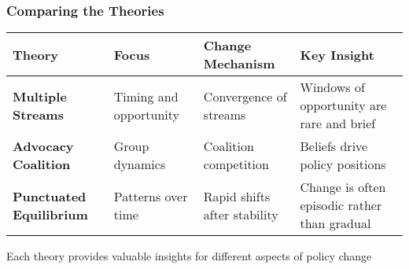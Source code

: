 \documentclass[10pt]{beamer}
\begin{document}
\begin{frame}
\frametitle{Comparing the Theories}

\begin{table}
\centering
\small
\begin{tabular}{|p{2.3cm}|p{2.3cm}|p{2.5cm}|p{3cm}|}
\hline
\centering\textbf{Theory} & \centering\textbf{Focus} & \centering\textbf{Change Mechanism} & \centering\textbf{Key Insight} \\
\hline
\pause
\centering\textbf{Multiple Streams} & \centering Timing and opportunity & \centering Convergence of streams & \centering Windows of opportunity are rare and brief \\
\hline
\pause
\centering\textbf{Advocacy Coalition} & \centering Group dynamics & \centering Coalition competition & \centering Beliefs drive policy positions \\
\hline
\pause
\centering\textbf{Punctuated Equilibrium} & \centering Patterns over time & \centering Rapid shifts after stability & \centering Change is often episodic rather than gradual \\
\hline
\end{tabular}
\end{table}

\pause
\vspace{0.5cm}
\centering
Each theory provides valuable insights for different aspects of policy change

\end{frame}
\end{document}
